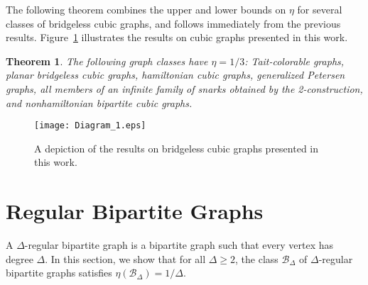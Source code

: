 \documentclass{article}
\newtheorem{thm}{Theorem}
\newcommand{\BB}{\mathcal{B}}
\begin{document}
The following theorem combines the upper and lower bounds on $\eta$ for several classes of bridgeless cubic graphs, and follows immediately from the previous results. Figure~\ref{fig:diagram} illustrates the results on cubic graphs presented in this work.


\begin{thm}
The following graph classes have $\eta = 1/3$: Tait-colorable graphs, planar bridgeless cubic graphs, hamiltonian cubic graphs, generalized Petersen graphs, all members of an infinite family of snarks obtained by the 2-construction, and nonhamiltonian bipartite cubic graphs.
\end{thm}


\begin{figure}[ht!]
\centering
\texttt{[image: Diagram\_1.eps]}
\caption{A depiction of the results on bridgeless cubic graphs presented in this work.}
\label{fig:diagram}
\end{figure}

\section{Regular Bipartite Graphs} \label{s:regular}

A $\Delta$-regular bipartite graph is a bipartite graph such that every vertex has degree $\Delta$. In this section, we show that for all $\Delta \geq 2$, the class $\BB_\Delta$ of $\Delta$-regular bipartite graphs satisfies $\eta(\BB_\Delta) = 1/\Delta$.
\end{document}
